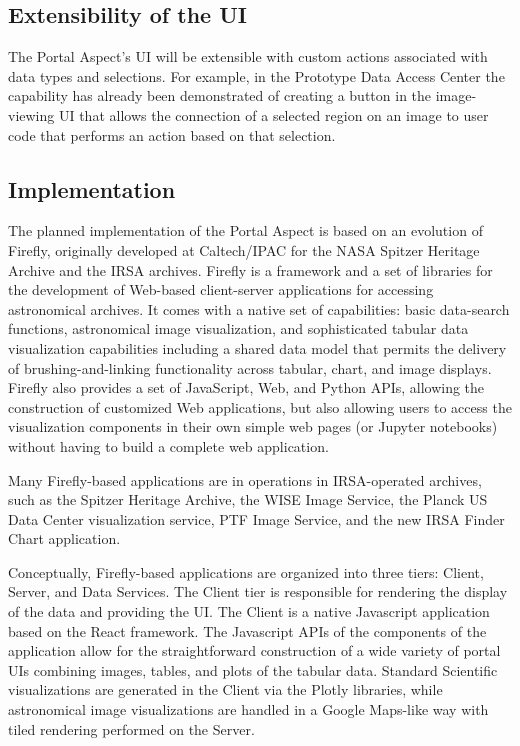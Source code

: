 \subsection{Extensibility of the UI}\label{extensibility-of-the-ui}

The Portal Aspect's UI will be extensible with custom actions associated with data types and selections.
For example, in the Prototype Data Access Center the capability has already been demonstrated of creating a button in the image-viewing UI that allows the connection of a selected region on an image to user code that performs an action based on that selection.

\subsection{Implementation}


The planned implementation of the Portal Aspect is based on an evolution of Firefly, originally developed at Caltech/IPAC for the NASA Spitzer Heritage Archive and the IRSA archives.
Firefly is a framework and a set of libraries for the development of Web-based client-server applications for accessing astronomical archives.
It comes with a native set of capabilities: basic data-search functions, astronomical image visualization, and sophisticated tabular data visualization capabilities including a shared data model that permits the delivery of brushing-and-linking functionality across tabular, chart, and image displays.
Firefly also provides a set of JavaScript, Web, and Python APIs, allowing the construction of customized Web applications, but also allowing users to access the visualization components in their own simple web pages (or Jupyter notebooks) without having to build a complete web application.

Many Firefly-based applications are in operations in IRSA-operated archives, such as the Spitzer Heritage Archive, the WISE Image Service, the Planck US Data Center visualization service, PTF Image Service, and the new IRSA Finder Chart application.

Conceptually, Firefly-based applications are organized into three tiers: Client, Server, and Data Services.
The Client tier is responsible for rendering the display of the data and providing the UI.
The Client is a native Javascript application based on the React framework.
The Javascript APIs of the components of the application allow for the straightforward construction of a wide variety of portal UIs combining images, tables, and plots of the tabular data.
Standard Scientific visualizations are generated in the Client via the Plotly libraries, while astronomical image visualizations are handled in a Google Maps-like way with tiled rendering performed on the Server.

